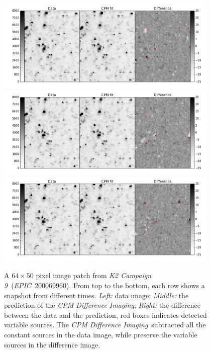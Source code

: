 \documentclass[12pt, preprint]{aastex}
\newcommand{\project}[1]{\textsl{#1}}
\newcommand{\cpmdiff}{\project{CPM Difference Imaging}}
\newcommand{\KTCN}{\project{K2 Campaign 9}}
\newcommand{\epic}{\project{EPIC}}
\begin{document}
\begin{figure}[p]
\begin{center}
\includegraphics[width=0.95\textwidth]{f5a}
\includegraphics[width=0.95\textwidth]{f5b}
\includegraphics[width=0.95\textwidth]{f5c}
\end{center}
\caption{
  \label{k2c9}
  A $64\times 50$ pixel image patch from \KTCN\ (\epic\ 200069960). 
  From top to the bottom,  each row shows a snapshot from different times.
  \emph{Left:} data image;
  \emph{Middle:} the prediction of the \cpmdiff;
  \emph{Right:} the difference between the data and the prediction, red boxes indicates detected variable sources.  
  The \cpmdiff\ subtracted all the constant sources in the data image, while preserve the variable sources in the difference image.
}
\end{figure}
\end{document}
